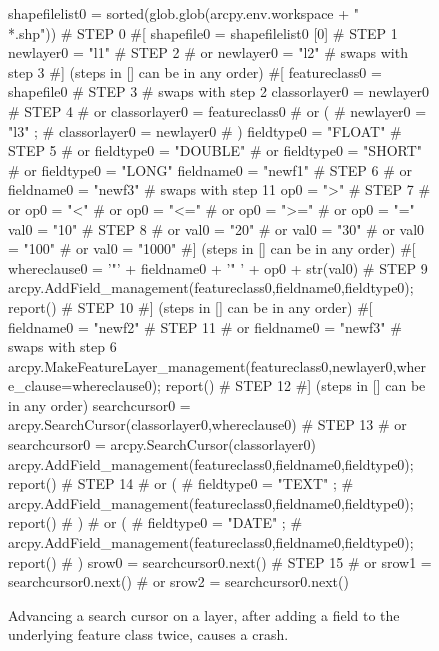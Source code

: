 \begin{figure}
{\scriptsize
\begin{code}
shapefilelist0 = sorted(glob.glob(arcpy.env.workspace + "\\*.shp"))                   \# STEP 0
\#[
shapefile0 = shapefilelist0 [0]                                                      \# STEP 1
newlayer0 = "l1"                                                                     \# STEP 2
\#  or newlayer0 = "l2" 
\#  swaps with step 3
\#] (steps in [] can be in any order)
\#[
featureclass0 = shapefile0                                                           \# STEP 3
\#  swaps with step 2
classorlayer0 = newlayer0                                                            \# STEP 4
\#  or classorlayer0 = featureclass0 
\#  or (
\#      newlayer0 = "l3"  ;
\#      classorlayer0 = newlayer0 
\#     )
fieldtype0 = "FLOAT"                                                                 \# STEP 5
\#  or fieldtype0 = "DOUBLE" 
\#  or fieldtype0 = "SHORT" 
\#  or fieldtype0 = "LONG" 
fieldname0 = "newf1"                                                                 \# STEP 6
\#  or fieldname0 = "newf3" 
\#  swaps with step 11
op0 = ">"                                                                            \# STEP 7
\#  or op0 = "<" 
\#  or op0 = "<=" 
\#  or op0 = ">=" 
\#  or op0 = "=" 
val0 = "10"                                                                          \# STEP 8
\#  or val0 = "20" 
\#  or val0 = "30" 
\#  or val0 = "100" 
\#  or val0 = "1000" 
\#] (steps in [] can be in any order)
\#[
whereclause0 = '"' + fieldname0 + '" ' + op0 + str(val0)                             \# STEP 9
arcpy.AddField\_management(featureclass0,fieldname0,fieldtype0); report()             \# STEP 10
\#] (steps in [] can be in any order)
\#[
fieldname0 = "newf2"                                                                 \# STEP 11
\#  or fieldname0 = "newf3" 
\#  swaps with step 6
arcpy.MakeFeatureLayer\_management(featureclass0,newlayer0,where\_clause=whereclause0); report()   \# STEP 12
\#] (steps in [] can be in any order)
searchcursor0 = arcpy.SearchCursor(classorlayer0,whereclause0)                       \# STEP 13
\#  or searchcursor0 = arcpy.SearchCursor(classorlayer0) 
arcpy.AddField\_management(featureclass0,fieldname0,fieldtype0); report()             \# STEP 14
\#  or (
\#      fieldtype0 = "TEXT"  ;
\#      arcpy.AddField\_management(featureclass0,fieldname0,fieldtype0); report() 
\#     )
\#  or (
\#      fieldtype0 = "DATE"  ;
\#      arcpy.AddField\_management(featureclass0,fieldname0,fieldtype0); report() 
\#     )
srow0 = searchcursor0.next()                                                         \# STEP 15
\#  or srow1 = searchcursor0.next() 
\#  or srow2 = searchcursor0.next()
\end{code}
}
\caption{Advancing a search cursor on a layer, after adding a field to
  the underlying feature class twice, causes a crash.}
\label{fault4}
\end{figure}